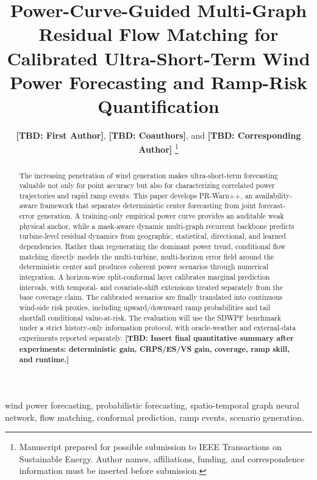 \documentclass[journal]{IEEEtran}
\newcommand{\TBD}[1]{\textbf{[TBD: #1]}}
\newcommand{\1}{\mathbb{I}}
\begin{document}
\title{Power-Curve-Guided Multi-Graph Residual Flow Matching for Calibrated Ultra-Short-Term Wind Power Forecasting and Ramp-Risk Quantification}

\author{\TBD{First Author}, \TBD{Coauthors}, and \TBD{Corresponding Author}%
\thanks{Manuscript prepared for possible submission to IEEE Transactions on Sustainable Energy. Author names, affiliations, funding, and correspondence information must be inserted before submission.}%
}

\maketitle

\begin{abstract}
The increasing penetration of wind generation makes ultra-short-term forecasting valuable not only for point accuracy but also for characterizing correlated power trajectories and rapid ramp events. This paper develops PR-Warn++, an availability-aware framework that separates deterministic center forecasting from joint forecast-error generation. A training-only empirical power curve provides an auditable weak physical anchor, while a mask-aware dynamic multi-graph recurrent backbone predicts turbine-level residual dynamics from geographic, statistical, directional, and learned dependencies. Rather than regenerating the dominant power trend, conditional flow matching directly models the multi-turbine, multi-horizon error field around the deterministic center and produces coherent power scenarios through numerical integration. A horizon-wise split-conformal layer calibrates marginal prediction intervals, with temporal- and covariate-shift extensions treated separately from the base coverage claim. The calibrated scenarios are finally translated into continuous wind-side risk proxies, including upward/downward ramp probabilities and tail shortfall conditional value-at-risk. The evaluation will use the SDWPF benchmark under a strict history-only information protocol, with oracle-weather and external-data experiments reported separately. \TBD{Insert final quantitative summary after experiments: deterministic gain, CRPS/ES/VS gain, coverage, ramp skill, and runtime.}
\end{abstract}

\begin{IEEEkeywords}
wind power forecasting, probabilistic forecasting, spatio-temporal graph neural network, flow matching, conformal prediction, ramp events, scenario generation.
\end{IEEEkeywords}
\end{document}
